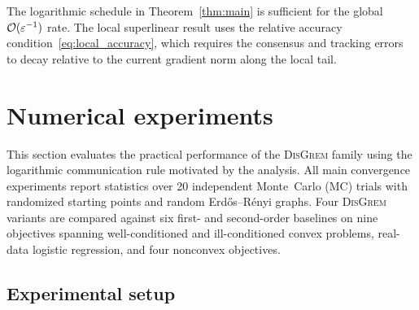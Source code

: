 \documentclass[review,onefignum,onetabnum]{siamart171218}
\begin{document}
	\begin{remark}
		The logarithmic schedule in Theorem~\ref{thm:main} is sufficient for
		the global $\mathcal{O}(\varepsilon^{-1})$ rate. The local superlinear result
		uses the relative accuracy condition~\eqref{eq:local_accuracy}, which
		requires the consensus and tracking errors to decay relative to the
		current gradient norm along the local tail.
	\end{remark}
	
	
	
	
	\section{Numerical experiments}\label{sec:experiments}
	
	This section evaluates the practical performance of the
	\textsc{DisGrem} family using the logarithmic communication rule
	motivated by the analysis.
	All main convergence experiments report statistics over
	20 independent Monte~Carlo (MC) trials with
	randomized starting points and random Erd\H{o}s--R\'{e}nyi graphs.
	Four \textsc{DisGrem} variants are compared against six first- and
	second-order baselines on nine objectives spanning well-conditioned
	and ill-conditioned convex problems, real-data logistic regression,
	and four nonconvex objectives.
	
	\subsection{Experimental setup}\label{ssec:setup}
	
\end{document}
